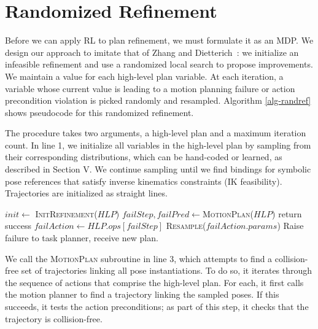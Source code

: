 \section{Randomized Refinement}
Before we can apply RL to plan refinement, we must formulate it as an MDP.
We design our approach to imitate that of Zhang and Dietterich~\cite{JobShopSched}:
we initialize an infeasible refinement and use a randomized local search to propose
improvements. We maintain a value for each high-level plan
variable. At each iteration, a variable whose current value is leading to a motion planning failure or
action precondition violation is picked randomly and resampled.
Algorithm \ref{alg-randref} shows pseudocode for this randomized refinement.

The procedure takes two arguments, a high-level plan and a maximum
iteration count. In line 1, we initialize all variables in the high-level plan by sampling
from their corresponding distributions, which can be hand-coded or learned, as described in Section V. We continue sampling
until we find bindings for symbolic pose references that satisfy
inverse kinematics constraints (IK feasibility). Trajectories are
initialized as straight lines.

\begin{algorithm}[t]
\begin{small}
  \SetAlgoLined
  \DontPrintSemicolon
   {
  \nl $init \leftarrow$ \textsc{InitRefinement}($HLP$)\;
  \nl {} {
  \nl $failStep, failPred \leftarrow $\textsc{MotionPlan}($HLP$)\;
  \nl {} {
  \nl return success }
  \nl {} {
  \nl $failAction \leftarrow HLP.ops[failStep]$\;
  \nl \textsc{Resample}($failAction.params$) }
  \nl {} }
  \nl Raise failure to task planner, receive new plan. }
\end{small}
\label{alg-randref}
\vspace{-1.5 em}
\end{algorithm}

We call the \textsc{MotionPlan} subroutine in line 3, which attempts to
find a collision-free set of trajectories linking all pose instantiations.
To do so, it iterates through the sequence of actions that comprise the high-level plan.
For each, it first calls the motion planner to find a trajectory
linking the sampled poses. If this succeeds, it tests the action preconditions;
as part of this step, it checks that the trajectory is collision-free.

